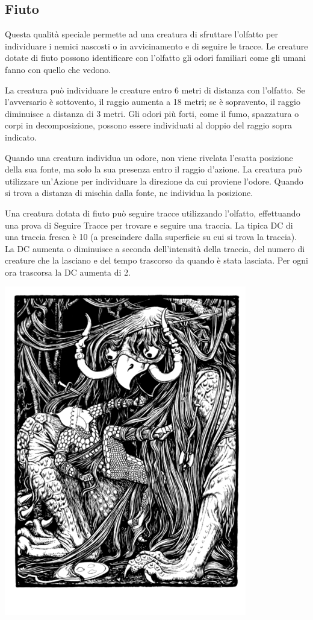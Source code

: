 \begin{multicols}{2}
\subsection{Fiuto}\label{fiuto}

Questa qualità speciale permette ad una creatura di sfruttare l'olfatto per individuare i nemici nascosti o in avvicinamento e di seguire le tracce. Le creature dotate di fiuto possono identificare con l'olfatto gli odori familiari come gli umani fanno con quello che vedono.

La creatura può individuare le creature entro 6 metri di distanza con l'olfatto. Se l'avversario è sottovento, il raggio aumenta a 18 metri; se è sopravento, il raggio diminuisce a distanza di 3 metri.
Gli odori più forti, come il fumo, spazzatura o corpi in decomposizione, possono essere individuati al doppio del raggio sopra indicato.

Quando una creatura individua un odore, non viene rivelata l'esatta posizione della sua fonte, ma solo la sua presenza entro il raggio d'azione. La creatura può utilizzare un'Azione per individuare la direzione da cui proviene l'odore. Quando si trova a distanza di mischia dalla fonte, ne individua la posizione.

Una creatura dotata di fiuto può seguire tracce utilizzando l'olfatto, effettuando una prova di Seguire Tracce per trovare e seguire una traccia. La tipica DC di una traccia fresca è 10 (a prescindere dalla superficie su cui si trova la traccia). La DC aumenta o diminuisce a seconda dell'intensità della traccia, del numero di creature che la lasciano e del tempo trascorso da quando è stata lasciata. Per ogni ora trascorsa la DC aumenta di 2.

\begin{center}
\includegraphics[width=0.7\linewidth]{immagini/mostro.png}


\end{center}
\end{multicols}
